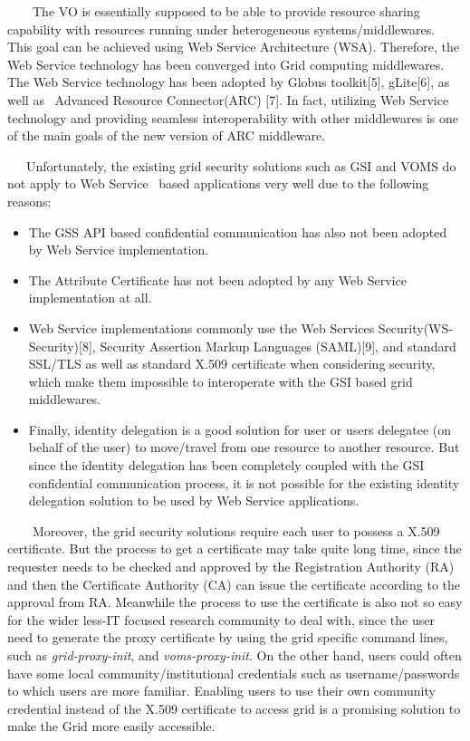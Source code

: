 \documentclass{article}
\newcommand\liststyleLiii{%
\renewcommand\labelitemi{${\bullet}$}
\renewcommand\labelitemii{${\circ}$}
\renewcommand\labelitemiii{${\blacksquare}$}
\renewcommand\labelitemiv{${\bullet}$}
}
\begin{document}
\ \ \ \ The VO is essentially supposed to be able to provide resource
sharing capability with resources running under heterogeneous
systems/middlewares. This goal can be achieved using Web Service
Architecture (WSA). Therefore, the Web Service technology has been
converged into Grid computing middlewares. The Web Service technology
has been adopted by Globus toolkit[5], gLite[6], as well as \ Advanced
Resource Connector(ARC) [7]. In fact, utilizing Web Service technology
and providing seamless interoperability with other middlewares is one
of the main goals of the new version of ARC middleware.

\ \ \ Unfortunately, the existing grid security solutions such as GSI
and VOMS do not apply to Web Service \ based applications very well due
to the following reasons:

\liststyleLiii
\begin{itemize}
\item The GSS API based confidential communication has also not been
adopted by Web Service implementation.
\item The Attribute Certificate has not been adopted by any Web Service
implementation at all.
\item Web Service implementations commonly use the Web Services
Security(WS-Security)[8], Security Assertion Markup Languages
(SAML)[9], and standard SSL/TLS as well as standard X.509 certificate
when considering security, which make them impossible to interoperate
with the GSI based grid middlewares.
\item Finally, identity delegation is a good solution for user or
user{\textquotesingle}s delegatee (on behalf of the user) to
move/travel from one resource to another resource. But since the
identity delegation has been completely coupled with the GSI
confidential communication process, it is not possible for the existing
identity delegation solution to be used by Web Service applications.
\end{itemize}
\ \ \ \ Moreover, the grid security solutions require each user to
possess a X.509 certificate. But the process to get a certificate may
take quite long time, since the requester needs to be checked and
approved by the Registration Authority (RA) and then the Certificate
Authority (CA) can issue the certificate according to the approval from
RA. Meanwhile the process to use the certificate is also not so easy
for the wider less-IT focused research community to deal with, since
the user need to generate the proxy certificate by using the grid
specific command lines, such as \textit{grid-proxy-init}, and
\textit{voms-proxy-init}. On the other hand, users could often have
some local community/institutional credentials such as
username/passwords to which users are more familiar. Enabling users to
use their own community credential instead of the X.509 certificate to
access grid is a promising solution to make the Grid more easily
accessible. 
\end{document}
